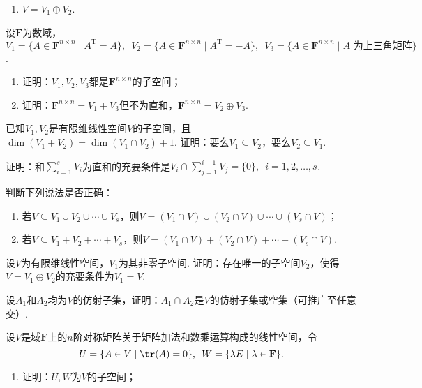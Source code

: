 \begin{exercise}
\begin{exgroup}
\begin{enumerate}
            \item $V=V_1\oplus V_2$.
        \end{enumerate}

        \item 设$\mathbf{F}$为数域，$V_1=\{A\in\mathbf{F}^{n\times n} \mid A^\mathrm{T}=A\},\enspace
            V_2=\{A\in\mathbf{F}^{n\times n} \mid A^\mathrm{T}=-A\},\enspace V_3=\{A\in\mathbf{F}^{n\times n} \mid A\text{~为上三角矩阵}\}$.
        \begin{enumerate}
            \item 证明：$V_1,V_2,V_3$都是$\mathbf{F}^{n\times n}$的子空间；

            \item 证明：$\mathbf{F}^{n\times n}=V_1+V_3$但不为直和，$\mathbf{F}^{n\times n}=V_2\oplus V_3$.
        \end{enumerate}

        \item 已知$V_1,V_2$是有限维线性空间$V$的子空间，且$\dim(V_1+V_2)=\dim(V_1 \cap V_2)+1$. 证明：要么$V_1 \subseteq V_2$，要么$V_2 \subseteq V_1$.

        \item 证明：和$\sum\limits_{i=1}^{s}V_i$为直和的充要条件是$V_i \cap \sum\limits_{j=1}^{i-1}V_j=\{0\},\enspace i=1,2,\ldots,s$.

        \item 判断下列说法是否正确：
        \begin{enumerate}
            \item 若$V \subseteq V_1 \cup V_2 \cup \cdots \cup V_s$，则$V=(V_1 \cap V)\cup(V_2 \cap V)\cup\cdots\cup(V_s \cap V)$；

            \item 若$V \subseteq V_1+V_2+\cdots +V_s$，则$V=(V_1 \cap V)+(V_2 \cap V)+\cdots+(V_s \cap V)$.
        \end{enumerate}

        \item 设$V$为有限维线性空间，$V_1$为其非零子空间. 证明：存在唯一的子空间$V_2$，使得$V=V_1\oplus V_2$的充要条件为$V_1=V$.

       \item 设$A_1$和$A_2$均为$V$的仿射子集，证明：$A_1\cap A_2$是$V$的仿射子集或空集（可推广至任意交）.
    \end{exgroup}

    \begin{exgroup}
        \item 设$V$是域$\mathbf{F}$上的$n$阶对称矩阵关于矩阵加法和数乘运算构成的线性空间，令
        \[U=\{A\in V \mid \tr(A)=0\},\enspace W=\{\lambda E \mid \lambda\in\mathbf{F}\}.\]
        \begin{enumerate}
            \item 证明：$U,W$为$V$的子空间；


\end{enumerate}
\end{exgroup}
\end{exercise}
